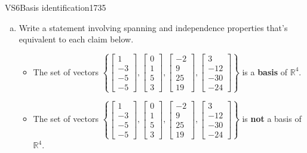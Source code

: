 \begin{exercise}{VS6}{Basis identification}{1735} 
\begin{exerciseStatement} 

\begin{enumerate}[(a)]
\item  

 Write a statement involving spanning and independence properties that's equivalent to each claim below. 

 

\begin{itemize}
\item  

 The set of vectors \(\left\{ \left[\begin{array}{c}
1 \\
-3 \\
-5 \\
-5
\end{array}\right] , \left[\begin{array}{c}
0 \\
1 \\
5 \\
3
\end{array}\right] , \left[\begin{array}{c}
-2 \\
9 \\
25 \\
19
\end{array}\right] , \left[\begin{array}{c}
3 \\
-12 \\
-30 \\
-24
\end{array}\right] \right\}\) is a \textbf{basis} of \(\mathbb{R}^4\). 

 
\item  

 The set of vectors \(\left\{ \left[\begin{array}{c}
1 \\
-3 \\
-5 \\
-5
\end{array}\right] , \left[\begin{array}{c}
0 \\
1 \\
5 \\
3
\end{array}\right] , \left[\begin{array}{c}
-2 \\
9 \\
25 \\
19
\end{array}\right] , \left[\begin{array}{c}
3 \\
-12 \\
-30 \\
-24
\end{array}\right] \right\}\) is \textbf{not} a basis of \(\mathbb{R}^4\). 


\end{itemize}
\end{enumerate}
\end{exerciseStatement}
\end{exercise}
